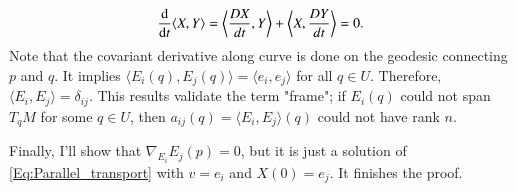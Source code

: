 \documentclass[a4paper, 12pt]{article}
\theoremstyle{Mydefinition}
\theoremstyle{Mytheorem}
\begin{document}
\begin{enumerate}
    \begin{equation}
        \dv{t}\langle X, Y\rangle = \left\langle \frac{DX}{dt}, Y\right\rangle + \left\langle X, \frac{DY}{dt}\right\rangle = 0.
    \end{equation}
    Note that the covariant derivative along curve is done on the geodesic connecting $p$ and $q$. It implies $\langle E_i(q), E_j(q)\rangle = \langle e_i, e_j\rangle$ for all $q\in U$. Therefore, $\langle E_i, E_j\rangle = \delta_{ij}$. This results validate the term "frame"; if $E_i(q)$ could  not span $T_qM$ for some $q\in U$, then $a_{ij}(q) = \langle E_i, E_j\rangle(q)$ could not have rank $n$.
    
    Finally, I'll show that $\nabla_{E_i}E_j(p) = 0$, but it is just a solution of \eqref{Eq:Parallel_transport} with $v = e_i$ and $X(0) = e_j$.
    It finishes the proof.
    

\end{enumerate}
\end{document}
